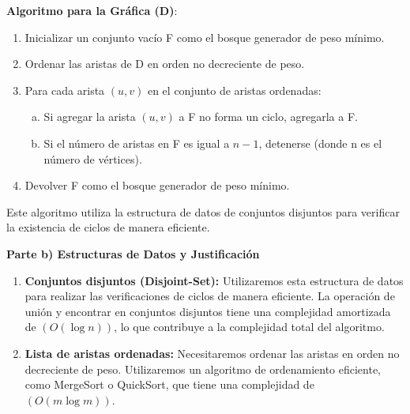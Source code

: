 \documentclass[answers, 11pt]{exam}
\begin{document}
\begin{questions}
\begin{solution}
\textbf{Algoritmo para la Gráfica (D)}:
    \begin{enumerate}[1.]
        \item Inicializar un conjunto vacío F como el bosque generador de peso mínimo.
        \item Ordenar las aristas de D en orden no decreciente de peso.
        \item Para cada arista $(u, v)$ en el conjunto de aristas ordenadas:
        \begin{enumerate}[a.]
            \item Si agregar la arista $(u, v)$ a F no forma un ciclo, agregarla a F.
            \item Si el número de aristas en F es igual a $n-1$, detenerse (donde n es el número de vértices).
        \end{enumerate}
        \item Devolver F como el bosque generador de peso mínimo.
    \end{enumerate}

Este algoritmo utiliza la estructura de datos de conjuntos disjuntos para verificar la existencia de ciclos de manera eficiente.

\textbf{Parte b) Estructuras de Datos y Justificación}

\begin{enumerate}[1.]
    \item \textbf{Conjuntos disjuntos (Disjoint-Set):} Utilizaremos esta estructura de datos para realizar las verificaciones de ciclos de manera eficiente. La operación de unión y encontrar en conjuntos disjuntos tiene una complejidad amortizada de $(O(\log n))$, lo que contribuye a la complejidad total del algoritmo.

    \item \textbf{Lista de aristas ordenadas:} Necesitaremos ordenar las aristas en orden no decreciente de peso. Utilizaremos un algoritmo de ordenamiento eficiente, como MergeSort o QuickSort, que tiene una complejidad de $(O(m \log m))$.
\end{enumerate}
\end{solution}

\end{questions}
\end{document}
